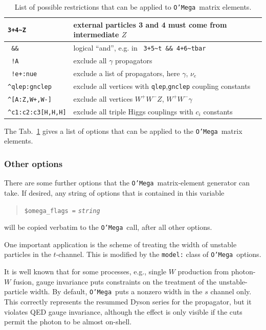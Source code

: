 \documentclass[12pt]{book}
\newcommand{\ttt}[1]{\texttt{#1}}
\newcommand{\oMega}{\ttt{O'Mega}}
\begin{document}
\begin{table}
  \begin{center}
    \begin{tabular}{|l|l|}
      \hline
      \verb|3+4~Z| & external particles 3 and 4 must come from
      intermediate $Z$ \\\hline
      \verb| && |   & logical ``and'', e.g. in
      \verb| 3+5~t && 4+6~tbar| \\\hline
      \verb| !A | & exclude all $\gamma$ propagators \\\hline
      \verb| !e+:nue | & exclude a list of propagators, here $\gamma$,
      $\nu_e$ \\\hline
      \verb|^qlep:gnclep| & exclude all vertices with
      \ttt{qlep},\ttt{gnclep} coupling constants \\\hline
      \verb|^[A:Z,W+,W-]| & exclude all vertices $W^+W^-Z$,
      $W^+W^-\gamma$ \\\hline
      \verb|^c1:c2:c3[H,H,H]| & exclude all triple Higgs couplings
      with $c_i$ constants
      \\\hline
    \end{tabular}
  \end{center}
  \caption{List of possible restrictions that can be applied to
    \oMega\ matrix elements.}
  \label{tab:restrictions}
\end{table}
The Tab.~\ref{tab:restrictions} gives a list of options that can be
applied to the \oMega\ matrix elements.


\subsubsection{Other options}

There are some further options that the \oMega\ matrix-element generator can
take.  If desired, any string of options that is contained in this variable
\begin{quote}
\begin{footnotesize}
  \verb|$omega_flags =| \ttt{\textit{string}}
\end{footnotesize}
\end{quote}
will be copied verbatim to the \oMega\ call, after all other options.

One important application is the scheme of treating the width of unstable
particles in the $t$-channel.  This is modified by the \verb|model:| class of
\oMega\ options.

It is well known that for some processes, e.g., single $W$ production from
photon-$W$ fusion, gauge invariance puts constraints on the treatment of the
unstable-particle width.  By default, \oMega\ puts a nonzero width in the $s$
channel only.  This correctly represents the resummed Dyson series for the
propagator, but it violates QED gauge invariance, although the effect is only
visible if the cuts permit the photon to be almost on-shell.
\end{document}
